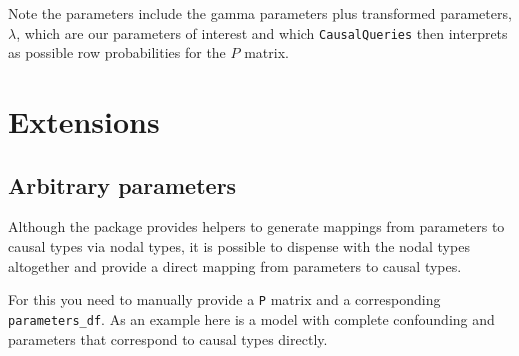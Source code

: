 \documentclass[
  12pt,
]{book}
\newenvironment{Shaded}{\begin{snugshade}}{\end{snugshade}}
\newcommand{\CommentTok}[1]{\textcolor[rgb]{0.56,0.35,0.01}{\textit{#1}}}
\newcommand{\DataTypeTok}[1]{\textcolor[rgb]{0.13,0.29,0.53}{#1}}
\newcommand{\DecValTok}[1]{\textcolor[rgb]{0.00,0.00,0.81}{#1}}
\newcommand{\FloatTok}[1]{\textcolor[rgb]{0.00,0.00,0.81}{#1}}
\newcommand{\KeywordTok}[1]{\textcolor[rgb]{0.13,0.29,0.53}{\textbf{#1}}}
\newcommand{\NormalTok}[1]{#1}
\newcommand{\OperatorTok}[1]{\textcolor[rgb]{0.81,0.36,0.00}{\textbf{#1}}}
\newcommand{\StringTok}[1]{\textcolor[rgb]{0.31,0.60,0.02}{#1}}
\begin{document}
Note the parameters include the gamma parameters plus transformed parameters, \(\lambda\), which are our parameters of interest and which \texttt{CausalQueries} then interprets as possible row probabilities for the \(P\) matrix.

\hypertarget{extensions}{%
\section{Extensions}\label{extensions}}

\hypertarget{arbitrary-parameters}{%
\subsection{Arbitrary parameters}\label{arbitrary-parameters}}

Although the package provides helpers to generate mappings from parameters to causal types via nodal types, it is possible to dispense with the nodal types altogether and provide a direct mapping from parameters to causal types.

For this you need to manually provide a \texttt{P} matrix and a corresponding \texttt{parameters\_df}. As an example here is a model with complete confounding and parameters that correspond to causal types directly.

\begin{Shaded}
\end{Shaded}
\end{document}
